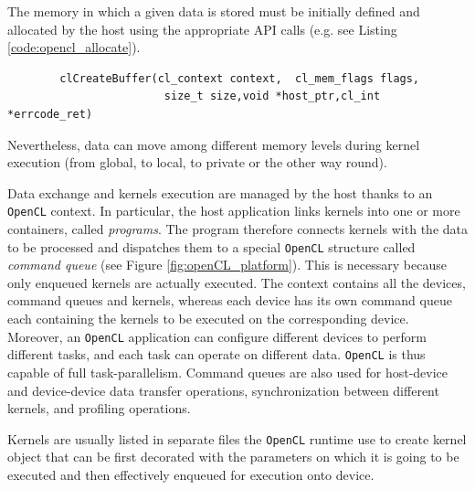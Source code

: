 \begin{description}
    The memory in which a given data is stored must be
    initially defined and allocated by the host using the appropriate API calls (e.g. see Listing \ref{code:opencl_allocate}). 
    \begin{lstlisting}
		clCreateBuffer(cl_context context,	cl_mem_flags flags,
						size_t size,void *host_ptr,cl_int *errcode_ret)
    \end{lstlisting}
  	 Nevertheless, data can move among different memory levels during kernel execution (from global, to local, to private or the other way round).
    
    Data exchange and kernels execution are managed by the host thanks
    to an \texttt{OpenCL} context. In particular, the host application links
    kernels into one or more containers, called \emph{programs}. The
    program therefore connects kernels with the data to be processed
    and dispatches them to a special \texttt{OpenCL} structure called
    \emph{command queue} (see Figure \ref{fig:openCL_platform}). This is necessary because only enqueued kernels are actually executed.
    The context contains all the
    devices, command queues and kernels, whereas each device has its own
    command queue each containing the kernels to be
    executed on the corresponding device. Moreover, an \texttt{OpenCL}
    application can configure different devices to perform different
    tasks, and each task can operate on different data. \texttt{OpenCL}
    is thus capable of full task-parallelism. Command queues are also
    used for host-device and device-device data transfer operations,
    synchronization between different kernels, and profiling
    operations.
    
    
	Kernels are usually listed in separate
    files the \texttt{OpenCL} runtime use to create kernel object that
    can be first decorated with the parameters on which it is going to
    be executed and then effectively enqueued for execution onto device.
    

\end{description}
